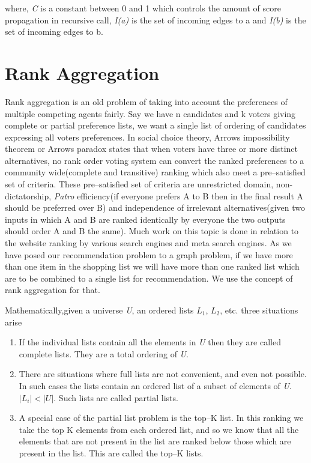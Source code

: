 where, \emph{C} is a constant between 0 and 1 which controls the amount of score propagation in recursive call, \emph{I(a)} is the set of incoming edges to a and \emph{I(b)} is the set of incoming edges to b.

\section{Rank Aggregation}
Rank aggregation is an old problem of taking into account the preferences of multiple competing agents fairly. Say we have n candidates and k voters giving complete or partial preference lists, we want a single list of ordering of candidates expressing all voters\textsc{} preferences. In social choice theory, Arrow\textsc{}s impossibility theorem or Arrow\textsc{}s paradox states that when voters have three or more distinct alternatives, no rank order voting system can convert the ranked preferences to a community wide(complete and transitive) ranking which also meet a pre--satisfied set of criteria. These pre--satisfied set of criteria are unrestricted domain, non-dictatorship, \emph{Patro} efficiency(if everyone prefers A to B then in the final result A should be preferred over B) and independence of irrelevant alternatives(given two inputs in which A and B are ranked identically by everyone the two outputs should order A and B the same). Much work on this topic is done in relation to the website ranking by various search engines and meta search engines. As we have posed our recommendation problem to a graph problem, if we have more than one item in the shopping list we will have more than one ranked list which are to be combined to a single list for recommendation. We use the concept of rank aggregation for that.

Mathematically,given a universe \emph{U}, an ordered lists $L_{1}$, $L_{2}$, etc. three situations arise

\begin{enumerate}
\item If the individual lists contain all the elements in \emph{U} then they are called complete lists. They are a total ordering of \emph{U}.
\item There are situations where full lists are not convenient, and even not possible. In such cases the lists contain an ordered list of a subset of elements of \emph{U}. $ \left | L_i \right | < \left | U \right |$. Such lists are called partial lists.
\item A special case of the partial list problem is the top--K list. In this ranking we take the top K elements from each ordered list, and so we know that all the elements that are not present in the list are ranked below those which are present in the list. This are called the top--K lists.
\end{enumerate}

